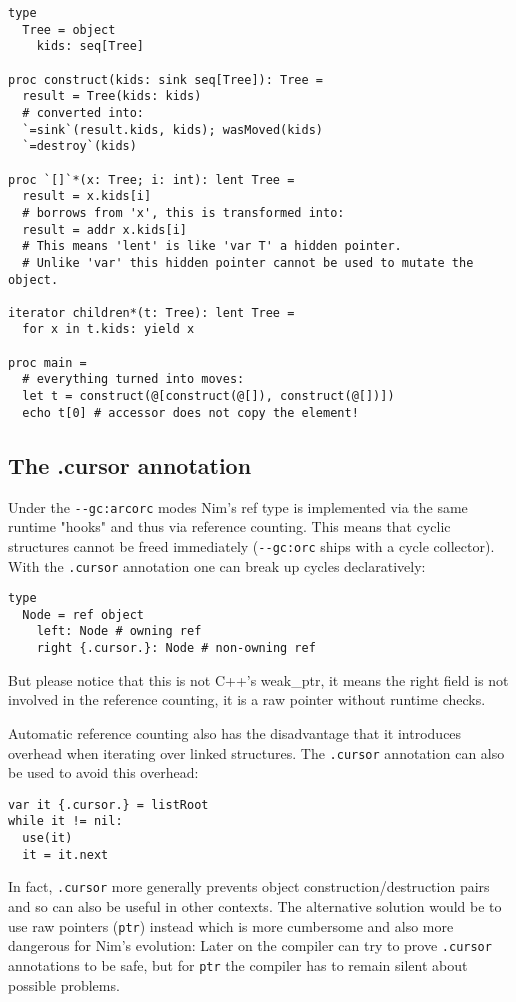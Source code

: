 \begin{verbatim}
type
  Tree = object
    kids: seq[Tree]

proc construct(kids: sink seq[Tree]): Tree =
  result = Tree(kids: kids)
  # converted into:
  `=sink`(result.kids, kids); wasMoved(kids)
  `=destroy`(kids)

proc `[]`*(x: Tree; i: int): lent Tree =
  result = x.kids[i]
  # borrows from 'x', this is transformed into:
  result = addr x.kids[i]
  # This means 'lent' is like 'var T' a hidden pointer.
  # Unlike 'var' this hidden pointer cannot be used to mutate the object.

iterator children*(t: Tree): lent Tree =
  for x in t.kids: yield x

proc main =
  # everything turned into moves:
  let t = construct(@[construct(@[]), construct(@[])])
  echo t[0] # accessor does not copy the element!
\end{verbatim}

\hypertarget{the-.cursor-annotation}{%
\subsection{The .cursor annotation}\label{the-.cursor-annotation}}

Under the \texttt{-\/-gc:arc\textbar{}orc} modes Nim's {ref} type is
implemented via the same runtime "hooks" and thus via reference
counting. This means that cyclic structures cannot be freed immediately
(\texttt{-\/-gc:orc} ships with a cycle collector). With the
\texttt{.cursor} annotation one can break up cycles declaratively:

\begin{verbatim}
type
  Node = ref object
    left: Node # owning ref
    right {.cursor.}: Node # non-owning ref
\end{verbatim}

But please notice that this is not C++'s weak\_ptr, it means the right
field is not involved in the reference counting, it is a raw pointer
without runtime checks.

Automatic reference counting also has the disadvantage that it
introduces overhead when iterating over linked structures. The
\texttt{.cursor} annotation can also be used to avoid this overhead:

\begin{verbatim}
var it {.cursor.} = listRoot
while it != nil:
  use(it)
  it = it.next
\end{verbatim}

In fact, \texttt{.cursor} more generally prevents object
construction/destruction pairs and so can also be useful in other
contexts. The alternative solution would be to use raw pointers
(\texttt{ptr}) instead which is more cumbersome and also more dangerous
for Nim's evolution: Later on the compiler can try to prove
\texttt{.cursor} annotations to be safe, but for \texttt{ptr} the
compiler has to remain silent about possible problems.

